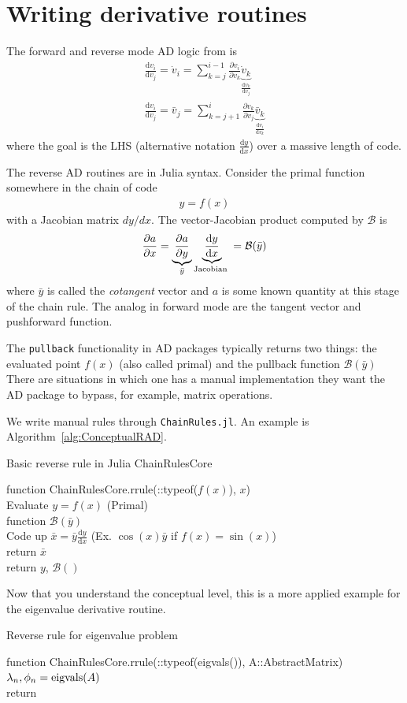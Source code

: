 \documentclass[10pt]{article}
\newcommand{\pp}[2]{\frac{\partial #1}{\partial #2}}
\newcommand{\dd}[2]{\frac{\textrm{d} #1}{\textrm{d} #2}}
\newcommand{\mcal}[1]{\mathcal{#1}}  %
\newcommand{\ben}{\begin{eqnarray*}}
\newcommand{\een}{\end{eqnarray*}}
\newcommand{\tn}[1]{\textnormal{#1}}
\begin{document}
\section{Writing derivative routines}
% 
The forward and reverse mode AD logic from \citet{Martins2022} is
\ben
\dd{v_i}{v_j} = \dot{v}_i = \sum_{k=j}^{i-1}\pp{v_i}{v_k} \underbrace{\dot{v}_k}_{\dd{v_k}{v_j}}
\\
\dd{v_i}{v_j} = \bar{v}_j = \sum_{k=j+1}^{i}{\pp{v_k}{v_j}} \underbrace{\bar{v}_k}_{\dd{v_i}{v_k}}
\een
where the goal is the LHS (alternative notation $\dd{y}{x}$) over a massive length of code.

The reverse AD routines are in Julia syntax.
Consider the primal function somewhere in the chain of code
\ben
y = f(x)
\een
with a Jacobian matrix $dy/dx$.
The vector-Jacobian product computed by $\mcal{B}$ is
\ben
\pp{a}{x} =
\underbrace{\pp{a}{y}}_{\bar{y}}
\underbrace{\dd{y}{x}}_{\tn{Jacobian }}
= \mcal{B}({\bar{y}})
\een
where $\bar{y}$ is called the \emph{cotangent} vector and $a$ is some known quantity at this stage of the chain rule.
The analog in forward mode are the tangent vector and pushforward function.

The \texttt{pullback} functionality in AD packages typically returns two things: the evaluated point $f(x)$ (also called primal) and the pullback function $\mcal{B}(\bar{y})$
There are situations in which one has a manual implementation they want the {AD} package to bypass, for example, matrix operations.

We write manual rules through \texttt{ChainRules.jl}.
An example is Algorithm~\ref{alg:ConceptualRAD}.
\begin{algorithm}[htb!]
    \caption{\label{alg:ConceptualRAD} Basic reverse rule in Julia ChainRulesCore}
    function ChainRulesCore.rrule(::typeof($f(x)$), $x$)\\
    \quad Evaluate $y = f(x)$ (Primal)\\
    \quad function $\mcal{B}(\bar{y})$\\
    \quad \quad Code up $\bar{x}= \bar{y} \dd{y}{x}$ (Ex. $\cos(x) \bar{y} $ if $f(x)=\sin(x)$)\\
    \quad return $\bar{x}$\\
    return $y$, $\mcal{B}()$
\end{algorithm}

Now that you understand the conceptual level, this is a more applied example for the eigenvalue derivative routine.
\begin{algorithm}[htb!]
    \caption{\label{alg:EigenRAD} Reverse rule for eigenvalue problem}
    function ChainRulesCore.rrule(::typeof(eigvals()), A::AbstractMatrix)\\
    \quad $\lambda_n, \phi_n = \tn{eigvals}(A)$ \\
    return
\end{algorithm}


\onecolumn
\appendix

\end{document}
